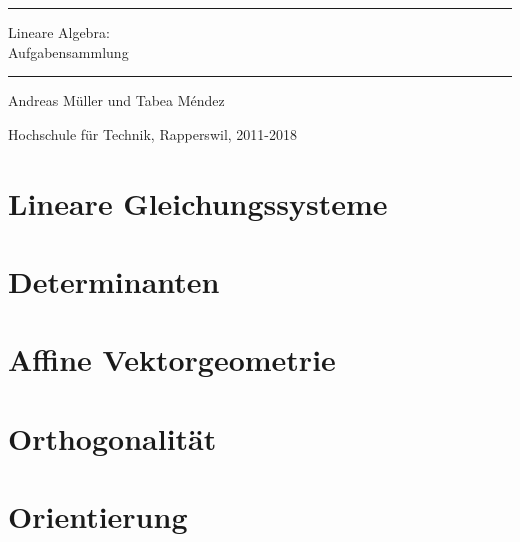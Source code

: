 \documentclass[a4paper,12pt]{book}
\begin{document}
\pagestyle{fancy}
\rhead{}
\frontmatter
\newcommand\HRule{\noindent\rule{\linewidth}{1.5pt}}
\begin{titlepage}
\HRule
\vspace*{2pt}
\begin{flushright}
{\Huge
Lineare Algebra:\\
\bigskip
Aufgabensammlung}
\end{flushright}
\HRule
\begin{flushright}
\vspace{30pt}
\LARGE
Andreas Müller
und
Tabea Méndez
\end{flushright}
\begin{center}
Hochschule für Technik, Rapperswil, 2011-2018
\end{center}
\end{titlepage}
\tableofcontents
\newenvironment{beispiel}[1][Beispiel]{%
\begin{proof}[#1]%
\renewcommand{\qedsymbol}{$\bigcirc$}
}{\end{proof}}
\mainmatter


\openthemaindex
{}
\allowdisplaybreaks
\chapter{Lineare Gleichungssysteme}

\chapter{Determinanten}

\chapter{Affine Vektorgeometrie}

\chapter{Orthogonalität}

\chapter{Orientierung}

\end{document}
